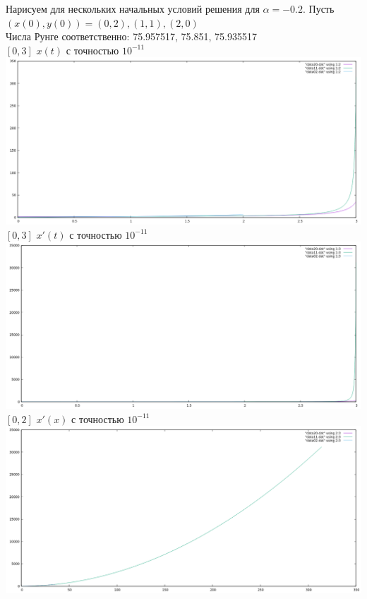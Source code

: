 \documentclass[12pt, a4paper] {report}
\theoremstyle{remark}
\theoremstyle{definition}
\begin{document}
\newpage
Нарисуем для нескольких начальных условий решения для $\alpha = -0.2$. Пусть $(x(0), y(0)) = {(0,2), (1,1), (2,0)}$ \\Числа Рунге соответственно: 75.957517, 75.851, 75.935517\\
$[0,3]$ $x(t)$ с точностью $10^{-11}$\\
\includegraphics[scale=0.45]{rash31.png}\\
$[0,3]$ $x'(t)$ с точностью $10^{-11}$\\
\includegraphics[scale=0.45]{rash32.png}\\
\newpage
$[0,2]$ $x'(x)$ с точностью $10^{-11}$\\
\includegraphics[scale=0.45]{rash33.png}\\
\newpage
\end{document}
